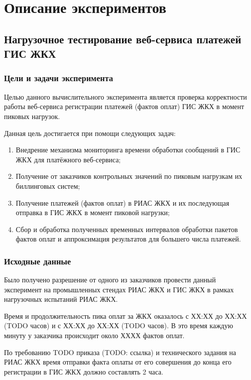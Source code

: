 \section{Описание экспериментов}

\subsection{Нагрузочное тестирование веб-сервиса платежей ГИС ЖКХ}

\subsubsection*{Цели и задачи эксперимента}

Целью данного вычислительного эксперимента является проверка корректности работы веб-сервиса регистрации платежей (фактов оплат) ГИС ЖКХ в момент пиковых нагрузок.

Данная цель достигается при помощи следующих задач:
\begin{enumerate}
	\item Внедрение механизма мониторинга времени обработки сообщений в ГИС ЖКХ для платёжного веб-сервиса;
	\item Получение от заказчиков контрольных значений по пиковым нагрузкам их биллинговых систем;
	\item Получение платежей (фактов оплат) в РИАС ЖКХ и их последующая отправка в ГИС ЖКХ в момент пиковой нагрузки;
	\item Сбор и обработка полученных временных интервалов обработки пакетов фактов оплат и аппроксимация результатов для большего числа платежей.
\end{enumerate}

\subsubsection*{Исходные данные}

Было получено разрешение от одного из заказчиков провести данный эксперимент на промышленных стендах РИАС ЖКХ и ГИС ЖКХ в рамках нагрузочных испытаний РИАС ЖКХ.

Время и продолжительность пика оплат за ЖКХ оказалось с ХХ:ХХ до ХХ:ХХ (TODO часов) и с ХХ:ХХ до ХХ:ХХ (TODO часов).
В это время каждую минуту у заказчика происходит около ХХХХ фактов оплат.

По требованию TODO приказа (TODO: ссылка) и технического задания на РИАС ЖКХ время отправки факта оплаты от его совершения до конца его регистрации в ГИС ЖКХ должно составлять 2 часа.

